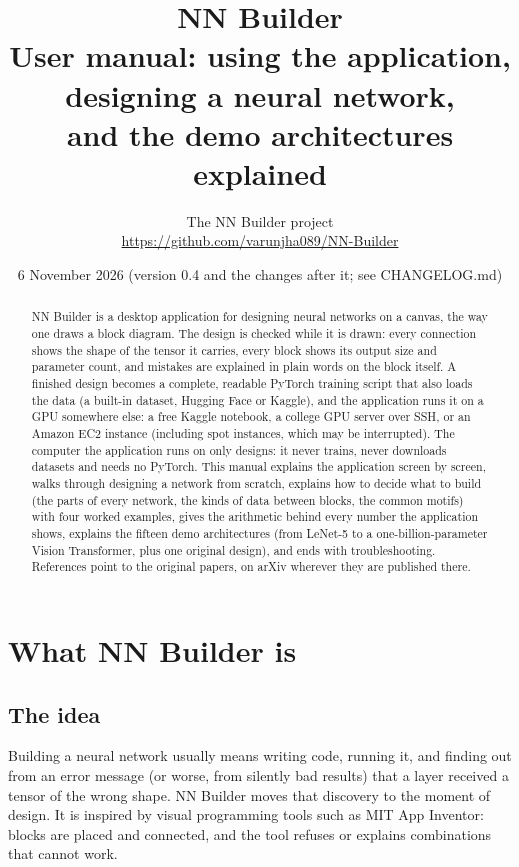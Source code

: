 \documentclass[11pt,a4paper]{article}
\title{\textbf{NN Builder}\\[4pt]\large User manual: using the application, designing a neural network,\\ and the demo architectures explained}
\author{The NN Builder project\\\small\url{https://github.com/varunjha089/NN-Builder}}
\date{6 November 2026 (version 0.4 and the changes after it; see CHANGELOG.md)}
\begin{document}
\maketitle

\begin{abstract}
NN Builder is a desktop application for designing neural networks on a canvas, the way one draws a block diagram. The design is checked
while it is drawn: every connection shows the shape of the tensor it carries, every block shows its output size and parameter count, and
mistakes are explained in plain words on the block itself. A finished design becomes a complete, readable PyTorch training script that also
loads the data (a built-in dataset, Hugging Face or Kaggle), and the application runs it on a GPU somewhere else: a free Kaggle notebook,
a college GPU server over SSH, or an Amazon EC2 instance (including spot instances, which may be interrupted). The computer the application
runs on only designs: it never trains, never downloads datasets and needs no PyTorch.
This manual explains the application screen by screen, walks through designing a network from scratch, explains how to decide what to build (the parts of every network, the
kinds of data between blocks, the common motifs) with four worked examples, gives the arithmetic behind every
number the application shows, explains the fifteen demo architectures (from LeNet-5 to a one-billion-parameter Vision Transformer, plus one
original design), and ends with troubleshooting. References point to the original papers, on arXiv wherever they are published there.
\end{abstract}

\tableofcontents
\newpage

\section{What NN Builder is}

\subsection{The idea}
Building a neural network usually means writing code, running it, and finding out from an error message (or worse, from silently bad
results) that a layer received a tensor of the wrong shape. NN Builder moves that discovery to the moment of design. It is inspired by
visual programming tools such as MIT App Inventor: blocks are placed and connected, and the tool refuses or explains combinations that cannot
work.
\end{document}

